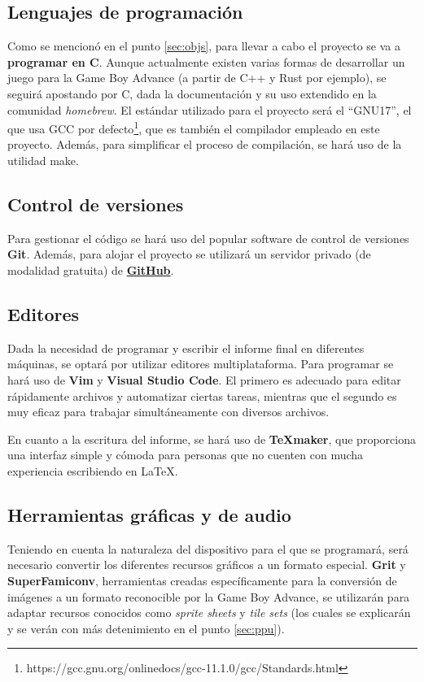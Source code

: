 \subsection{Lenguajes de programación}
Como se mencionó en el punto \ref{sec:objs}, para llevar a cabo el proyecto se va a \textbf{programar en C}. Aunque actualmente existen varias formas de desarrollar un juego para la Game Boy Advance (a partir de C++ y Rust por ejemplo), se seguirá apostando por C, dada la documentación y su uso extendido en la comunidad \textit{homebrew}. El estándar utilizado para el proyecto será el ``GNU17'', el que usa GCC por defecto\footnote{https://gcc.gnu.org/onlinedocs/gcc-11.1.0/gcc/Standards.html}, que es también el compilador empleado en este proyecto. Además, para simplificar el proceso de compilación, se hará uso de la utilidad make.

\subsection{Control de versiones}
Para gestionar el código se hará uso del popular software de control de versiones \textbf{Git}. Además, para alojar el proyecto se utilizará un servidor privado (de modalidad gratuita) de \textbf{\href{https://github.com/}{GitHub}}.

\subsection{Editores}
Dada la necesidad de programar y escribir el informe final en diferentes máquinas, se optará por utilizar editores multiplataforma. Para programar se hará uso de \textbf{Vim} y \textbf{Visual Studio Code}. El primero es adecuado para editar rápidamente archivos y automatizar ciertas tareas, mientras que el segundo es muy eficaz para trabajar simultáneamente con diversos archivos.

En cuanto a la escritura del informe, se hará uso de \textbf{\TeX maker}, que proporciona una interfaz simple y cómoda para personas que no cuenten con mucha experiencia escribiendo en \LaTeX.

\subsection{Herramientas gráficas y de audio}\label{sec:herr_graficas}
Teniendo en cuenta la naturaleza del dispositivo para el que se programará, será necesario convertir los diferentes recursos gráficos a un formato especial. \textbf{Grit} y \textbf{SuperFamiconv}, herramientas creadas específicamente para la conversión de imágenes a un formato reconocible por la Game Boy Advance, se utilizarán para adaptar recursos conocidos como \textit{sprite sheets} y \textit{tile sets} (los cuales se explicarán y se verán con más detenimiento en el punto \ref{sec:ppu}).


